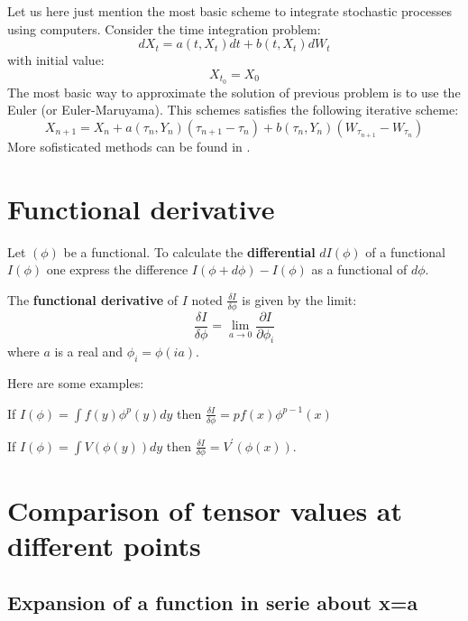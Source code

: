 \documentclass[12pt]{book}
\begin{document}
Let us here just mention the most basic scheme to integrate stochastic
processes using computers. Consider the time integration problem:
\begin{equation}
dX_t=a(t,X_t)dt+b(t,X_t)dW_t
\end{equation}
with initial value:
\begin{equation}
X_{t_0}=X_0
\end{equation}
The most basic way to approximate the solution of previous problem is
to use the Euler (or Euler-Maruyama). This schemes satisfies the following
iterative scheme: 
\begin{equation}
X_{n+1}=
X_n+a(\tau_n,Y_n)(\tau_{n+1}-\tau_n)+b(\tau_n,Y_n)(W_{\tau_{n+1}}-W_{\tau_n})
\end{equation}
More sofisticated methods can be found in \cite{ma:stoch:Kloeden92}.


\section{Functional derivative}
Let $(\phi)$ be a functional.
To calculate the {\bf differential}  $dI(\phi)$ of a functional
$I(\phi)$ one express the difference $I(\phi+d\phi)-I(\phi)$ as a
functional of $d\phi$.

The {\bf functional derivative} of $I$ noted $\frac{\delta I}{\delta \phi}$
is given by the limit:
\begin{equation}
\frac{\delta I}{\delta \phi}=\lim_{a\rightarrow 0}\frac{\partial
I}{\partial \phi_i}
\end{equation}
where $a$ is a real and $\phi_i=\phi(ia)$.

Here are some examples:
\begin{exmp}
If $I(\phi)=\int f(y)\phi^p(y)dy$ then $\frac{\delta I}{\delta
\phi}=pf(x)\phi^{p-1}(x) $
\end{exmp}

\begin{exmp}
If $I(\phi)=\int V(\phi(y))dy$ then $\frac{\delta I}{\delta
\phi}=V^\prime(\phi(x))$.
\end{exmp}



\section{Comparison of tensor values at different points}\label{chapretour}
\subsection{Expansion of a function in serie about x=a}
\end{document}
